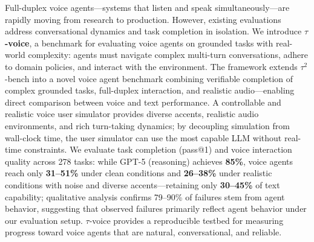 
Full-duplex voice agents—systems that listen and speak simultaneously—are rapidly moving from research to production. However, existing evaluations address conversational dynamics and task completion in isolation. We introduce \textbf{$\tau$-voice}, a benchmark for evaluating voice agents on grounded tasks with real-world complexity: agents must navigate complex multi-turn conversations, adhere to domain policies, and interact with the environment. The framework extends $\tau^2$-bench into a novel voice agent benchmark combining verifiable completion of complex grounded tasks, full-duplex interaction, and realistic audio—enabling direct comparison between voice and text performance. A controllable and realistic voice user simulator provides diverse accents, realistic audio environments, and rich turn-taking dynamics; by decoupling simulation from wall-clock time, the user simulator can use the most capable LLM without real-time constraints. We evaluate task completion (pass@1) and voice interaction quality across 278 tasks: while GPT-5 (reasoning) achieves \textbf{85\%}, voice agents reach only \textbf{31--51\%} under clean conditions and \textbf{26--38\%} under realistic conditions with noise and diverse accents—retaining only \textbf{30--45\%} of text capability; qualitative analysis confirms 79--90\% of failures stem from agent behavior, suggesting that observed failures primarily reflect agent behavior under our evaluation setup. $\tau$-voice provides a reproducible testbed for measuring progress toward voice agents that are natural, conversational, and reliable.

